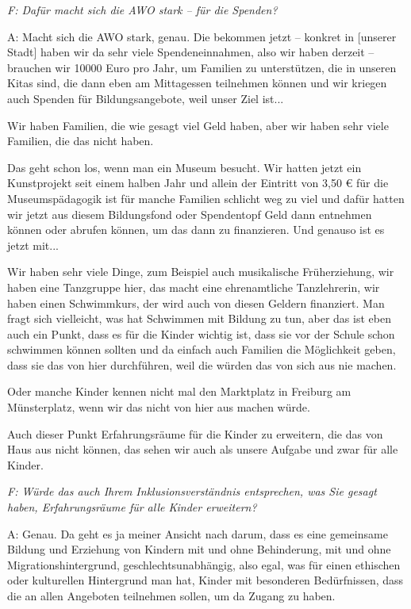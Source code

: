 \begin{linenumbers*}
\emph{F: Dafür macht sich die AWO stark -- für die Spenden?}

A: Macht sich die AWO stark, genau. Die bekommen jetzt -- konkret in [unserer Stadt] haben wir da sehr viele Spendeneinnahmen, also wir haben derzeit -- brauchen wir 10000 Euro pro Jahr, um Familien zu unterstützen, die in unseren Kitas sind, die dann eben am Mittagessen teilnehmen können und wir kriegen auch Spenden für Bildungsangebote, weil unser Ziel ist... 

Wir haben Familien, die wie gesagt viel Geld haben, aber wir haben sehr viele Familien, die das nicht haben. 

Das geht schon los, wenn man ein Museum besucht. Wir hatten jetzt ein Kunstprojekt seit einem halben Jahr und allein der Eintritt von 3,50 € für die Museumspädagogik ist für manche Familien schlicht weg zu viel und dafür hatten wir jetzt aus diesem Bildungsfond oder Spendentopf Geld dann entnehmen können oder abrufen können, um das dann zu finanzieren. Und genauso ist es jetzt mit... 

Wir haben sehr viele Dinge, zum Beispiel auch musikalische Früherziehung, wir haben eine Tanzgruppe hier, das macht eine ehrenamtliche Tanzlehrerin, wir haben einen Schwimmkurs, der wird auch von diesen Geldern finanziert. Man fragt sich vielleicht, was hat Schwimmen mit Bildung zu tun, aber das ist eben auch ein Punkt, dass es für die Kinder wichtig ist, dass sie vor der Schule schon schwimmen können sollten und da einfach auch Familien die Möglichkeit geben, dass sie das von hier durchführen, weil die würden das von sich aus nie machen. 

Oder manche Kinder kennen nicht mal den Marktplatz in Freiburg am Münsterplatz, wenn wir das nicht von hier aus machen würde. 

Auch dieser Punkt Erfahrungsräume für die Kinder zu erweitern, die das von Haus aus nicht können, das sehen wir auch als unsere Aufgabe und zwar für alle Kinder.

\emph{F: Würde das auch Ihrem Inklusionsverständnis entsprechen, was Sie gesagt haben, Erfahrungsräume für alle Kinder erweitern?}

A: Genau. Da geht es ja meiner Ansicht nach darum, dass es eine gemeinsame Bildung und Erziehung von Kindern mit und ohne Behinderung, mit und ohne Migrationshintergrund, geschlechtsunabhängig, also egal, was für einen ethischen oder kulturellen Hintergrund man hat, Kinder mit besonderen Bedürfnissen, dass die an allen Angeboten teilnehmen sollen, um da Zugang zu haben. 


\end{linenumbers*}
